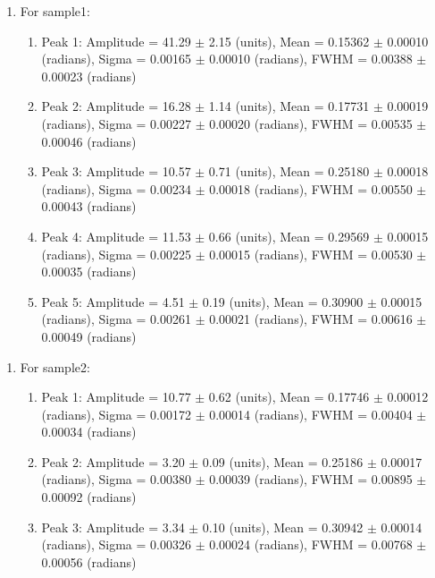 \begin{enumerate}
    \item For sample1:
    \begin{enumerate}
    \item Peak 1: Amplitude = 41.29 $\pm$ 2.15 (units), Mean = 0.15362 $\pm$ 0.00010 (radians), Sigma = 0.00165 $\pm$ 0.00010 (radians), FWHM = 0.00388 $\pm$ 0.00023 (radians)
    \item Peak 2: Amplitude = 16.28 $\pm$ 1.14 (units), Mean = 0.17731 $\pm$ 0.00019 (radians), Sigma = 0.00227 $\pm$ 0.00020 (radians), FWHM = 0.00535 $\pm$ 0.00046 (radians)
    \item Peak 3: Amplitude = 10.57 $\pm$ 0.71 (units), Mean = 0.25180 $\pm$ 0.00018 (radians), Sigma = 0.00234 $\pm$ 0.00018 (radians), FWHM = 0.00550 $\pm$ 0.00043 (radians)
    \item Peak 4: Amplitude = 11.53 $\pm$ 0.66 (units), Mean = 0.29569 $\pm$ 0.00015 (radians), Sigma = 0.00225 $\pm$ 0.00015 (radians), FWHM = 0.00530 $\pm$ 0.00035 (radians)
    \item Peak 5: Amplitude = 4.51 $\pm$ 0.19 (units), Mean = 0.30900 $\pm$ 0.00015 (radians), Sigma = 0.00261 $\pm$ 0.00021 (radians), FWHM = 0.00616 $\pm$ 0.00049 (radians)
    \end{enumerate}
    \end{enumerate}
    \begin{enumerate}
    \item For sample2:
    \begin{enumerate}
    \item Peak 1: Amplitude = 10.77 $\pm$ 0.62 (units), Mean = 0.17746 $\pm$ 0.00012 (radians), Sigma = 0.00172 $\pm$ 0.00014 (radians), FWHM = 0.00404 $\pm$ 0.00034 (radians)
    \item Peak 2: Amplitude = 3.20 $\pm$ 0.09 (units), Mean = 0.25186 $\pm$ 0.00017 (radians), Sigma = 0.00380 $\pm$ 0.00039 (radians), FWHM = 0.00895 $\pm$ 0.00092 (radians)
    \item Peak 3: Amplitude = 3.34 $\pm$ 0.10 (units), Mean = 0.30942 $\pm$ 0.00014 (radians), Sigma = 0.00326 $\pm$ 0.00024 (radians), FWHM = 0.00768 $\pm$ 0.00056 (radians)
    \end{enumerate}
    \end{enumerate}